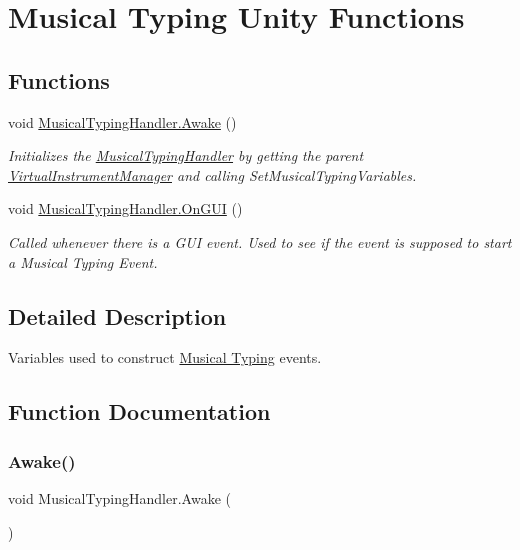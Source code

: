 \hypertarget{group___mus_typ_unity}{}\section{Musical Typing Unity Functions}
\label{group___mus_typ_unity}
\subsection*{Functions}
\begin{DoxyCompactItemize}
\item 
void \hyperlink{group___mus_typ_unity_ga2935e4d4209f57f19ea242968c861f3f}{Musical\+Typing\+Handler.\+Awake} ()
\begin{DoxyCompactList}\small\item\em Initializes the \hyperlink{class_musical_typing_handler}{Musical\+Typing\+Handler} by getting the parent \hyperlink{class_virtual_instrument_manager}{Virtual\+Instrument\+Manager} and calling Set\+Musical\+Typing\+Variables. \end{DoxyCompactList}\item 
void \hyperlink{group___mus_typ_unity_ga13a20522cf119917cb41e21051122977}{Musical\+Typing\+Handler.\+On\+G\+UI} ()
\begin{DoxyCompactList}\small\item\em Called whenever there is a G\+UI event. Used to see if the event is supposed to start a Musical Typing Event. \end{DoxyCompactList}\end{DoxyCompactItemize}


\subsection{Detailed Description}
Variables used to construct \hyperlink{group___mus_typ}{Musical Typing} events. 

\subsection{Function Documentation}
\mbox{\label{group___mus_typ_unity_ga2935e4d4209f57f19ea242968c861f3f}} 
\subsubsection{\texorpdfstring{Awake()}{Awake()}}
{\footnotesize\ttfamily void Musical\+Typing\+Handler.\+Awake (\begin{DoxyParamCaption}{ }\end{DoxyParamCaption})\hspace{0.3cm}{\ttfamily [private]}}



